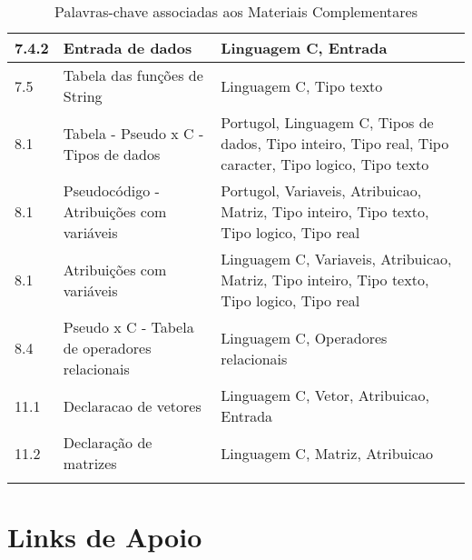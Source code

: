 \begin{longtable}{| p{} | p{} | p{} |}
7.4.2                & Entrada de dados                                           & Linguagem C, Entrada                                                                                   \\ \hline
7.5                  & Tabela das funções de String                               & Linguagem C, Tipo texto                                                                                \\ \hline
8.1                  & Tabela - Pseudo x C - Tipos de dados                       & Portugol, Linguagem C, Tipos de dados, Tipo inteiro, Tipo real, Tipo caracter, Tipo logico, Tipo texto \\ \hline
8.1                  & Pseudocódigo - Atribuições com variáveis                   & Portugol, Variaveis, Atribuicao, Matriz, Tipo inteiro, Tipo texto, Tipo logico, Tipo real              \\ \hline
8.1                  & Atribuições com variáveis                                  & Linguagem C, Variaveis, Atribuicao, Matriz, Tipo inteiro, Tipo texto, Tipo logico, Tipo real           \\ \hline
8.4                  & Pseudo x C - Tabela de operadores relacionais              & Linguagem C, Operadores relacionais                                                                    \\ \hline
11.1                 & Declaracao de vetores                                      & Linguagem C, Vetor, Atribuicao, Entrada                                                                \\ \hline
11.2                 & Declaração de matrizes                                     & Linguagem C, Matriz, Atribuicao \\ \hline
\caption{Palavras-chave associadas aos Materiais Complementares}
\label{tab:palavras-chave-materiais-complementares}
\end{longtable}


\section{Links de Apoio}

